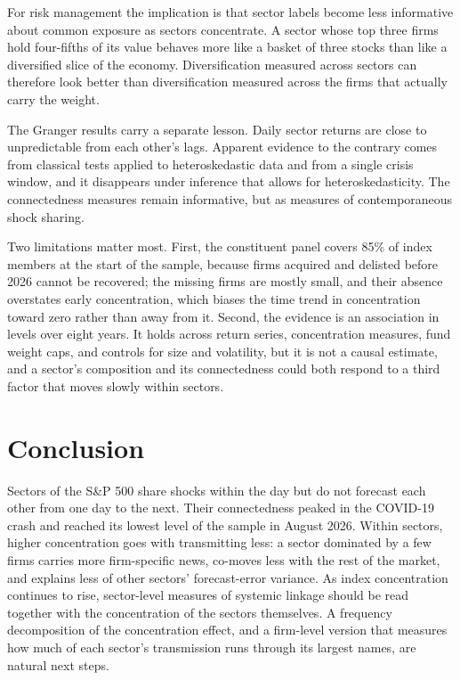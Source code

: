 \documentclass[11pt]{article}
\begin{document}
For risk management the implication is that sector labels become less informative about common exposure as sectors concentrate. A sector whose top three firms hold four-fifths of its value behaves more like a basket of three stocks than like a diversified slice of the economy. Diversification measured across sectors can therefore look better than diversification measured across the firms that actually carry the weight.

The Granger results carry a separate lesson. Daily sector returns are close to unpredictable from each other's lags. Apparent evidence to the contrary comes from classical tests applied to heteroskedastic data and from a single crisis window, and it disappears under inference that allows for heteroskedasticity. The connectedness measures remain informative, but as measures of contemporaneous shock sharing.

Two limitations matter most. First, the constituent panel covers 85\% of index members at the start of the sample, because firms acquired and delisted before 2026 cannot be recovered; the missing firms are mostly small, and their absence overstates early concentration, which biases the time trend in concentration toward zero rather than away from it. Second, the evidence is an association in levels over eight years. It holds across return series, concentration measures, fund weight caps, and controls for size and volatility, but it is not a causal estimate, and a sector's composition and its connectedness could both respond to a third factor that moves slowly within sectors.

\section{Conclusion}

Sectors of the S\&P 500 share shocks within the day but do not forecast each other from one day to the next. Their connectedness peaked in the COVID-19 crash and reached its lowest level of the sample in August 2026. Within sectors, higher concentration goes with transmitting less: a sector dominated by a few firms carries more firm-specific news, co-moves less with the rest of the market, and explains less of other sectors' forecast-error variance. As index concentration continues to rise, sector-level measures of systemic linkage should be read together with the concentration of the sectors themselves. A frequency decomposition of the concentration effect, and a firm-level version that measures how much of each sector's transmission runs through its largest names, are natural next steps.
\end{document}
